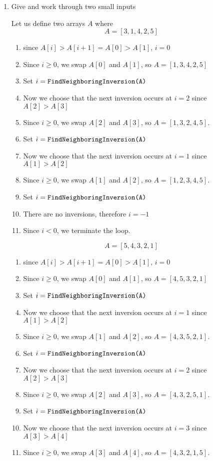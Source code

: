 \documentclass[12pt]{article}
\begin{document}
\begin{enumerate}
    \item Give and work through two small inputs
        
    Let us define two arrays $A$ where
        \[ 
            A = [3, 1, 4, 2, 5]
        \]
        
        \begin{enumerate}
            \item since $A[i] > A[i + 1] = A[0] > A[1]$, $i = 0$
            \item Since $i \geq 0$, we swap $A[0]$ and $A[1]$, so $A =  [1, 3, 4, 2, 5]$
            \item Set $i = \verb|FindNeighboringInversion(A)|$
            \item Now we choose that the next inversion occurs at $i = 2$ since $A[2] > A[3]$
            \item Since $i \geq 0$, we swap $A[2]$ and $A[3]$, so $A = [1, 3, 2, 4, 5]$.
            \item Set $i = \verb|FindNeighboringInversion(A)|$
            \item Now we choose that the next inversion occurs at $i = 1$ since $A[1] > A[2]$
            \item Since $i \geq 0$, we swap $A[1]$ and $A[2]$, so $A = [1, 2, 3, 4, 5]$.
            \item Set $i = \verb|FindNeighboringInversion(A)|$
            \item There are no inversions, therefore  $i = -1$
            \item Since $i < 0$, we terminate the loop.
        \end{enumerate}

        \[
            A = [5, 4, 3, 2, 1]
        \]

        \begin{enumerate}
            \item since $A[i] > A[i + 1] = A[0] > A[1]$, $i = 0$
            \item Since $i \geq 0$, we swap $A[0]$ and $A[1]$, so $A =  [4, 5, 3, 2, 1]$
            \item Set $i = \verb|FindNeighboringInversion(A)|$
            \item Now we choose that the next inversion occurs at $i = 1$ since $A[1] > A[2]$
            \item Since $i \geq 0$, we swap $A[1]$ and $A[2]$, so $A = [4, 3, 5, 2, 1]$.
            \item Set $i = \verb|FindNeighboringInversion(A)|$
            \item Now we choose that the next inversion occurs at $i = 2$ since $A[2] > A[3]$
            \item Since $i \geq 0$, we swap $A[2]$ and $A[3]$, so $A = [4, 3, 2, 5, 1]$.
            \item Set $i = \verb|FindNeighboringInversion(A)|$
            \item Now we choose that the next inversion occurs at $i = 3$ since $A[3] > A[4]$
            \item Since $i \geq 0$, we swap $A[3]$ and $A[4]$, so $A = [4, 3, 2, 1, 5]$.
        \end{enumerate}


\end{enumerate}
\end{document}
